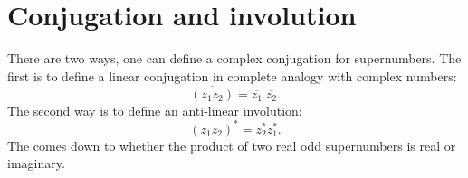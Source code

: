 \documentclass[12pt]{article}
\theoremstyle{inlinedefn}
\theoremstyle{break}
\renewcommand*{\bar}[1]{\overline{#1}}
\begin{document}
\section{Conjugation and involution}

There are two ways, one can define a complex conjugation for supernumbers.
The first is to define a linear conjugation in complete analogy with complex numbers:
\[
\bar{(z_1 z_2)} = \bar{z_1} \;\bar{z_2}.
\]
The second way is to define an anti-linear involution:
\[
(z_1 z_2)^* = z_2^* z_1^*.
\]
The  comes down to whether the product of two real odd supernumbers is real or imaginary.
\end{document}
